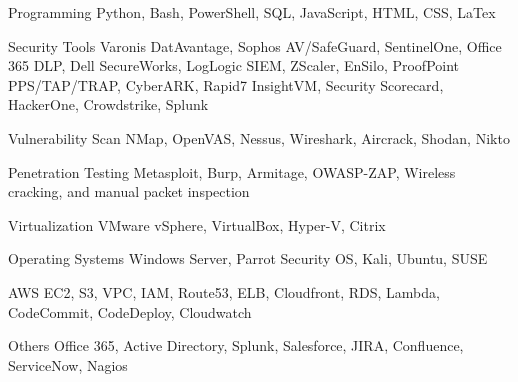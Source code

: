 
\begin{cvskills}
  \cvskill
    {Programming} %
    {Python, Bash, PowerShell, SQL, JavaScript, HTML, CSS, LaTex} %

  \cvskill
    {Security Tools} %
    {Varonis DatAvantage, Sophos AV/SafeGuard, SentinelOne, Office 365 DLP, Dell SecureWorks, LogLogic SIEM, ZScaler, \newline
      EnSilo, ProofPoint PPS/TAP/TRAP, CyberARK, Rapid7 InsightVM, Security Scorecard, HackerOne, Crowdstrike, Splunk} %

  \cvskill
     {Vulnerability Scan} %
     {NMap, OpenVAS, Nessus, Wireshark, Aircrack, Shodan, Nikto} %
 
  \cvskill
     {Penetration Testing} %
     {Metasploit, Burp, Armitage, OWASP-ZAP, Wireless cracking, and manual packet inspection} %
 
  \cvskill
    {Virtualization} %
    {VMware vSphere, VirtualBox, Hyper-V, Citrix} %

  \cvskill
    {Operating Systems} %
    {Windows Server, Parrot Security OS, Kali, Ubuntu, SUSE} %

  \cvskill
    {AWS} %
    {EC2, S3, VPC, IAM, Route53, ELB, Cloudfront, RDS, Lambda, CodeCommit, CodeDeploy, Cloudwatch} %

  \cvskill
    {Others} %
    {Office 365, Active Directory, Splunk, Salesforce, JIRA, Confluence, ServiceNow, Nagios} %

\end{cvskills}
